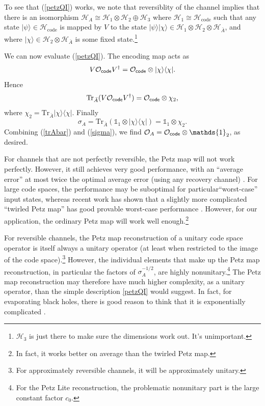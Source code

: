 \documentclass[11pt]{article}
\newcommand{\be}{\begin{equation}}
\newcommand{\ee}{\end{equation}}
\numberwithin{equation}{section}
\def\tr{\text{Tr}}
\begin{document}
To see that (\ref{petzQI}) works, we note that reversiblity of the channel implies that there is an isomorphism $\mathcal{H}_A \cong \mathcal{H}_1 \otimes \mathcal{H}_2 \oplus \mathcal{H}_3$ where $\mathcal{H}_1 \cong \mathcal{H}_\text{code}$ such that any state $|\psi \rangle \in \mathcal{H}_\text{code}$ is mapped by $V$ to the state $|\psi\rangle |\chi\rangle \in \mathcal{H}_1 \otimes \mathcal{H}_2 \otimes \mathcal{H}_{\bar A}$, and where $ |\chi\rangle \in \mathcal{H}_2 \otimes \mathcal{H}_{\bar A}$ is some fixed state.\footnote{$\mathcal{H}_3$ is just there to make sure the dimensions work out. It's unimportant.}

We can now evaluate (\ref{petzQI}). The encoding map acts as
\be
V \mathcal{O}_{\sf code} V^\dagger = \mathcal{O}_{\sf code} \otimes |\chi \rangle\langle \chi|.
\ee
Hence
\be
\text{Tr}_{\bar A} (V \mathcal{O}_{\sf code} V^\dagger) = \mathcal{O}_{\sf code} \otimes \chi_2,\label{trAbar}
\ee
where $\chi_2 = \text{Tr}_{\bar A}  |\chi \rangle\langle \chi|$. Finally
\be
\sigma_A = \tr_{\bar A}(\mathds{1}_1\otimes |\chi\rangle\langle \chi|) = \mathds{1}_1 \otimes \chi_2.\label{sigma}
\ee
Combining (\ref{trAbar}) and (\ref{sigma}), we find $\mathcal{O}_A = \mathcal{O}_{\sf code}\otimes \mathds{1}_2$, as desired.

For channels that are not perfectly reversible, the Petz map will not work perfectly. However, it still achieves very good performance, with an ``average error'' at most twice the optimal average error (using any recovery channel) \cite{barnum2002reversing}. For large code spaces, the performance may be suboptimal for particular``worst-case'' input states, whereas recent work has shown that a slightly more complicated ``twirled Petz map'' has good provable worst-case performance \cite{junge2018universal}. However, for our application, the ordinary Petz map will work well enough.\footnote{In fact, it works better on average than the twirled Petz map.}

For reversible channels, the Petz map reconstruction of a unitary code space operator is itself always a unitary operator (at least when restricted to the image of the code space).\footnote{For approximately reversible channels, it will be approximately unitary.} However, the individual elements that make up the Petz map reconstruction, in particular the factors of $\sigma_A^{-1/2}$, are highly nonunitary.\footnote{For the Petz Lite reconstruction, the problematic nonunitary part is the large constant factor $c_0$.} The Petz map reconstruction may therefore have much higher complexity, as a unitary operator, than the simple description \eqref{petzQI} would suggest. In fact, for evaporating black holes, there is good reason to think that it is exponentially complicated \cite{Harlow:2013tf, PythonsLunch}.
\end{document}
